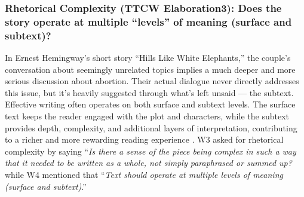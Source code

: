 \subsubsection{\textbf{{\color{blue}Rhetorical Complexity (TTCW Elaboration3)}: Does the story operate at multiple ``levels'' of meaning (surface and subtext)?}}In Ernest Hemingway's short story ``Hills Like White Elephants,'' the couple's conversation about seemingly unrelated topics implies a much deeper and more serious discussion about abortion. Their actual dialogue never directly addresses this issue, but it's heavily suggested through what's left unsaid — the subtext. Effective writing often operates on both surface and subtext levels. The surface text keeps the reader engaged with the plot and characters, while the subtext provides depth, complexity, and additional layers of interpretation, contributing to a richer and more rewarding reading experience \citet{kochis2007baxter,phelan1996narrative}. W3 asked for rhetorical complexity by saying ``\textit{Is there a sense of the piece being complex in such a way that it needed to be written as a whole, not simply paraphrased or summed up?} while W4 mentioned that ``\textit{Text should operate at multiple levels of meaning (surface and subtext)}.''
